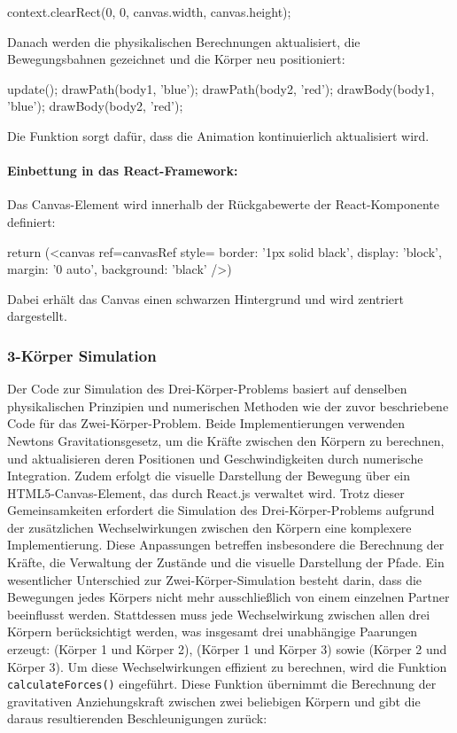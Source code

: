 \documentclass[a4paper,12pt,twoside]{article}
\begin{document}
\begin{javascript}
context.clearRect(0, 0, canvas.width, canvas.height);
\end{javascript}

Danach werden die physikalischen Berechnungen aktualisiert, die Bewegungsbahnen gezeichnet und die Körper neu positioniert:

\begin{javascript}
update();
drawPath(body1, 'blue');
drawPath(body2, 'red');
drawBody(body1, 'blue');
drawBody(body2, 'red');
\end{javascript}

Die Funktion  sorgt dafür, dass die Animation kontinuierlich aktualisiert wird.

\paragraph{Einbettung in das React-Framework:}
Das Canvas-Element wird innerhalb der Rückgabewerte der React-Komponente definiert:

\begin{javascript}
return (<canvas ref={canvasRef} style={{ border: '1px solid black', display: 'block', margin: '0 auto', background: 'black' }} />)
\end{javascript}
Dabei erhält das Canvas einen schwarzen Hintergrund und wird zentriert dargestellt.


\subsubsection{3-Körper Simulation}
Der Code zur Simulation des Drei-Körper-Problems basiert auf denselben physikalischen Prinzipien und numerischen Methoden wie der zuvor beschriebene Code für das Zwei-Körper-Problem. Beide Implementierungen verwenden Newtons Gravitationsgesetz, um die Kräfte zwischen den Körpern zu berechnen, und aktualisieren deren Positionen und Geschwindigkeiten durch numerische Integration. Zudem erfolgt die visuelle Darstellung der Bewegung über ein HTML5-Canvas-Element, das durch React.js verwaltet wird. Trotz dieser Gemeinsamkeiten erfordert die Simulation des Drei-Körper-Problems aufgrund der zusätzlichen Wechselwirkungen zwischen den Körpern eine komplexere Implementierung. Diese Anpassungen betreffen insbesondere die Berechnung der Kräfte, die Verwaltung der Zustände und die visuelle Darstellung der Pfade.
Ein wesentlicher Unterschied zur Zwei-Körper-Simulation besteht darin, dass die Bewegungen jedes Körpers nicht mehr ausschließlich von einem einzelnen Partner beeinflusst werden. Stattdessen muss jede Wechselwirkung zwischen allen drei Körpern berücksichtigt werden, was insgesamt drei unabhängige Paarungen erzeugt: (Körper 1 und Körper 2), (Körper 1 und Körper 3) sowie (Körper 2 und Körper 3). Um diese Wechselwirkungen effizient zu berechnen, wird die Funktion \texttt{calculateForces()} eingeführt. Diese Funktion übernimmt die Berechnung der gravitativen Anziehungskraft zwischen zwei beliebigen Körpern und gibt die daraus resultierenden Beschleunigungen zurück:
\end{document}

